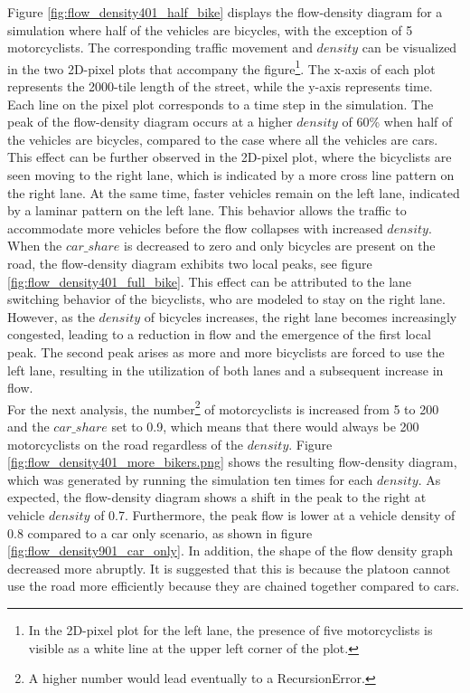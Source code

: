 Figure \ref{fig:flow_density401_half_bike} displays the flow-density diagram for a simulation where half of the vehicles are bicycles, with the exception of 5 motorcyclists. The corresponding traffic movement and $density$ can be visualized in the two 2D-pixel plots that accompany the figure\footnote{In the 2D-pixel plot for the left lane, the presence of five motorcyclists is visible as a white line at the upper left corner of the plot.}. The x-axis of each plot represents the 2000-tile length of the street, while the y-axis represents time. Each line on the pixel plot corresponds to a time step in the simulation. 
The peak of the flow-density diagram occurs at a higher $density$ of 60\% when half of the vehicles are bicycles, compared to the case where all the vehicles are cars. This effect can be further observed in the 2D-pixel plot, where the bicyclists are seen moving to the right lane, which is indicated by a more cross line pattern on the right lane. At the same time, faster vehicles remain on the left lane, indicated by a laminar pattern on the left lane. This behavior allows the traffic to accommodate more vehicles before the flow collapses with increased $density$.\\

When the $car\_share$ is decreased to zero and only bicycles are present on the road, the flow-density diagram exhibits two local peaks, see figure \ref{fig:flow_density401_full_bike}. This effect can be attributed to the lane switching behavior of the bicyclists, who are modeled to stay on the right lane. However, as the $density$ of bicycles increases, the right lane becomes increasingly congested, leading to a reduction in flow and the emergence of the first local peak. The second peak arises as more and more bicyclists are forced to use the left lane, resulting in the utilization of both lanes and a subsequent increase in flow. \\

For the next analysis, the number\footnote{A higher number would lead eventually to a RecursionError.} of motorcyclists is increased from 5 to 200 and the $car\_share$ set to 0.9, which means that there would always be 200 motorcyclists on the road regardless of the $density$. Figure \ref{fig:flow_density401_more_bikers.png} shows the resulting flow-density diagram, which was generated by running the simulation ten times for each $density$. As expected, the flow-density diagram shows a shift in the peak to the right at vehicle $density$ of 0.7. Furthermore, the peak flow is lower at a vehicle density of 0.8 compared to a car only scenario, as shown in figure \ref{fig:flow_density901_car_only}. In addition, the shape of the flow density graph decreased more abruptly. It is suggested that this is because the platoon cannot use the road more efficiently because they are chained together compared to cars. 


